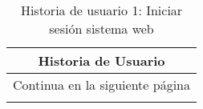 \begin{longtable}{|p{6.7cm}|p{6.7cm}|}
    \caption{Historia de usuario 1: Iniciar sesión sistema web} \label{tab:historia-1}
    \\
    \hline
    \multicolumn{2}{|c|}{\textbf{Historia de Usuario}}                                                                                                                     \\
    \hline

    \endfirsthead

    \hline
    \endhead

    \hline
    \multicolumn{2}{|c|}{{Continua en la siguiente página}}                                                                                                                \\
    \hline
    \endfoot

    \hline
    \endlastfoot


\end{longtable}
